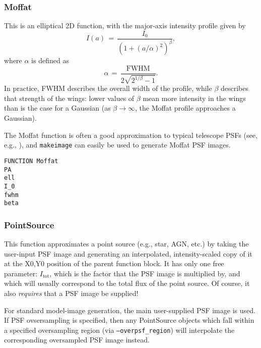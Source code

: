 \documentclass[10pt,a4paper,article]{memoir}
\newcommand{\makeimage}{\texttt{makeimage}}
\begin{document}
\subsubsection{Moffat}

This is an elliptical 2D \citet{moffat69} function, with the major-axis intensity profile
given by
\begin{equation}
I(a) \, = \, \frac{I_{0}  }{(1 + (a/\alpha)^{2})^{\beta} },
\end{equation}
where $\alpha$ is defined as
\begin{equation}
\alpha \, = \, \frac{ {\mathrm{FWHM}}}{2 \sqrt{2^{1/\beta} - 1}}.
\end{equation}
In practice, FWHM describes the overall width of the profile, while $\beta$ describes that
strength of the wings: lower values of $\beta$ mean more intensity in the wings
than is the case for a Gaussian (as $\beta \rightarrow \infty$, the Moffat profile
approaches a Gaussian).

The Moffat function is often a good approximation to typical telescope PSFs (see, e.g.,
\citealt{trujillo01}), and \makeimage{} can easily be used to generate Moffat PSF images.

\begin{verbatim}
FUNCTION Moffat
PA
ell
I_0
fwhm
beta
\end{verbatim}


%


\subsubsection{PointSource}

This function approximates a point source (e.g., star, AGN, etc.) by
taking the user-input PSF image and generating an interpolated,
intensity-scaled copy of it at the X0,Y0 position of the parent function
block. It has only one free parameter: $I_{\mathrm{tot}}$, which is the
factor that the PSF image is multiplied by, and which will usually
correspond to the total flux of the point source. Of course, it also
\textit{requires} that a PSF image be supplied!

For standard model-image generation, the main user-supplied PSF image is
used. If PSF ovsersampling is specified, then any PointSource objects
which fall within a specified oversampling region (via
\texttt{--overpsf\_region}) will interpolate the corresponding
oversampled PSF image instead.
\end{document}
